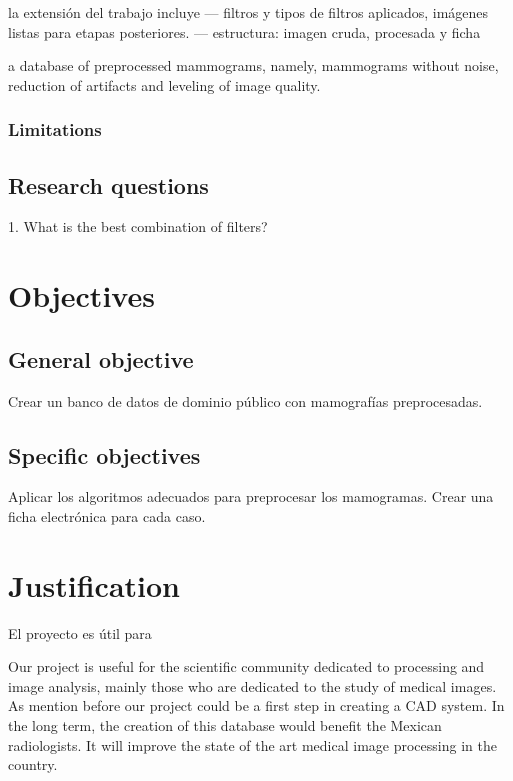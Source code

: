 la extensión del trabajo incluye --- filtros y tipos de filtros aplicados, imágenes listas para etapas posteriores. 
 --- estructura: imagen cruda, procesada y ficha

a database of preprocessed mammograms, namely, mammograms without noise,
reduction of artifacts and leveling of image quality.

\subsubsection{Limitations}

\subsection{Research questions}

1. What is the best combination of filters?

\section{Objectives}
\subsection{General objective}

Crear un banco de datos de dominio público con mamografías preprocesadas.

\subsection{Specific objectives}

Aplicar los algoritmos adecuados para preprocesar los mamogramas.
Crear una ficha electrónica para cada caso.

\section{Justification}

El proyecto es útil para

Our project is useful for the scientific community dedicated to processing and
image analysis, mainly those who are dedicated to the study of medical images.
As mention before our project could be a first step in creating a CAD system.
In the long term, the creation of this database would benefit the Mexican
radiologists. It will improve the state of the art medical image processing in
the country.

